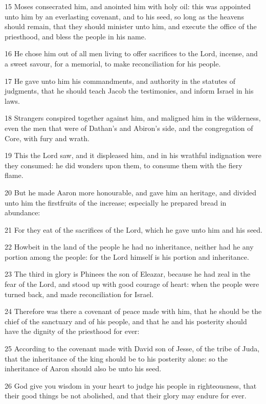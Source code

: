 \par 15 Moses consecrated him, and anointed him with holy oil: this was appointed unto him by an everlasting covenant, and to his seed, so long as the heavens should remain, that they should minister unto him, and execute the office of the priesthood, and bless the people in his name.
\par 16 He chose him out of all men living to offer sacrifices to the Lord, incense, and a sweet savour, for a memorial, to make reconciliation for his people.
\par 17 He gave unto him his commandments, and authority in the statutes of judgments, that he should teach Jacob the testimonies, and inform Israel in his laws.
\par 18 Strangers conspired together against him, and maligned him in the wilderness, even the men that were of Dathan's and Abiron's side, and the congregation of Core, with fury and wrath.
\par 19 This the Lord saw, and it displeased him, and in his wrathful indignation were they consumed: he did wonders upon them, to consume them with the fiery flame.
\par 20 But he made Aaron more honourable, and gave him an heritage, and divided unto him the firstfruits of the increase; especially he prepared bread in abundance:
\par 21 For they eat of the sacrifices of the Lord, which he gave unto him and his seed.
\par 22 Howbeit in the land of the people he had no inheritance, neither had he any portion among the people: for the Lord himself is his portion and inheritance.
\par 23 The third in glory is Phinees the son of Eleazar, because he had zeal in the fear of the Lord, and stood up with good courage of heart: when the people were turned back, and made reconciliation for Israel.
\par 24 Therefore was there a covenant of peace made with him, that he should be the chief of the sanctuary and of his people, and that he and his posterity should have the dignity of the priesthood for ever:
\par 25 According to the covenant made with David son of Jesse, of the tribe of Juda, that the inheritance of the king should be to his posterity alone: so the inheritance of Aaron should also be unto his seed.
\par 26 God give you wisdom in your heart to judge his people in righteousness, that their good things be not abolished, and that their glory may endure for ever.

